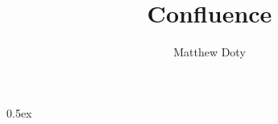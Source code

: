 \documentclass[11pt,a4paper]{article}
\begin{document}
\title{Confluence}
\author{Matthew Doty}
\maketitle

\tableofcontents

\newpage

\parindent 0pt\parskip 0.5ex





\end{document}
